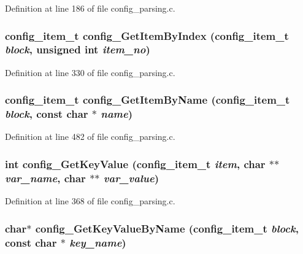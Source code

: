 Definition at line 186 of file config\_\-parsing.c.
\subsubsection[{config\_\-GetItemByIndex}]{\setlength{\rightskip}{0pt plus 5cm}config\_\-item\_\-t config\_\-GetItemByIndex (config\_\-item\_\-t {\em block}, \/  unsigned int {\em item\_\-no})}\label{config__parsing_8c_a6232f17aec5d583443924e79b536002}




Definition at line 330 of file config\_\-parsing.c.
\subsubsection[{config\_\-GetItemByName}]{\setlength{\rightskip}{0pt plus 5cm}config\_\-item\_\-t config\_\-GetItemByName (config\_\-item\_\-t {\em block}, \/  const char $\ast$ {\em name})}\label{config__parsing_8c_dac5bbcc24cd2a61cc5b5490b2db24f9}




Definition at line 482 of file config\_\-parsing.c.
\subsubsection[{config\_\-GetKeyValue}]{\setlength{\rightskip}{0pt plus 5cm}int config\_\-GetKeyValue (config\_\-item\_\-t {\em item}, \/  char $\ast$$\ast$ {\em var\_\-name}, \/  char $\ast$$\ast$ {\em var\_\-value})}\label{config__parsing_8c_ff2105a8be08ca4687d93ae8f1db2fde}




Definition at line 368 of file config\_\-parsing.c.
\subsubsection[{config\_\-GetKeyValueByName}]{\setlength{\rightskip}{0pt plus 5cm}char$\ast$ config\_\-GetKeyValueByName (config\_\-item\_\-t {\em block}, \/  const char $\ast$ {\em key\_\-name})}\label{config__parsing_8c_d6f35ab17c0c80a1a63d1f495db136fd}




